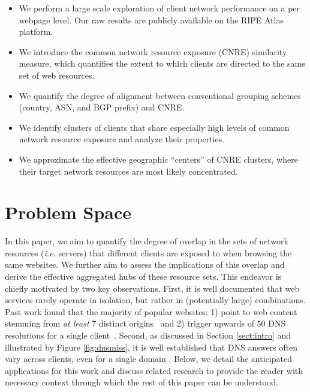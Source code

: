 \begin{itemize}%
    \item We perform a large scale exploration of client network performance on a per webpage level. Our
        raw results are publicly available on the RIPE Atlas platform.
    \item We introduce the common network resource exposure (CNRE) similarity
        measure, which quantifies the extent to which clients are directed to
        the same set of web resources.
    \item  We quantify the degree of alignment between conventional grouping schemes (country, ASN, and BGP prefix)
        and CNRE.
    \item We identify clusters of clients that share especially high levels of
        common network resource exposure and analyze their properties.
    \item We approximate the effective geographic ``centers'' of CNRE clusters,
        where their target network resources are most likely concentrated.
\end{itemize}

\section{Problem Space} \label{skyspace}

In this paper, we aim to quantify the degree of overlap in the sets of network
resources (\emph{i.e.} servers) that different clients are exposed to when
browsing the same websites. We further aim to assess the implications of this
overlap and derive the effective aggregated hubs of these resource sets. This endeavor is chiefly motivated by two key
observations. First, it is well documented that web services rarely operate in
isolation, but rather in (potentially large) combinations. Past work found that the
majority of popular websites: 1) point to web content stemming from \emph{at least}
7 distinct origins~\cite{butkiewicz2011} and 2) trigger upwards of 50 DNS
resolutions for a single client~\cite{dnssly}. Second, as discussed in
Section \ref{sect:intro} and illustrated by Figure \ref{fig:dnsmiss}, it is well
established that DNS answers often vary across clients, even for a single domain
\cite{ecs15sigcomm,Calder2013,benchaita2016stability,exploringedns,warrior2017drongo}.
Below, we detail the anticipated applications for this work and discuss related
research to provide the reader with necessary context through which the rest of
this paper can be understood.

